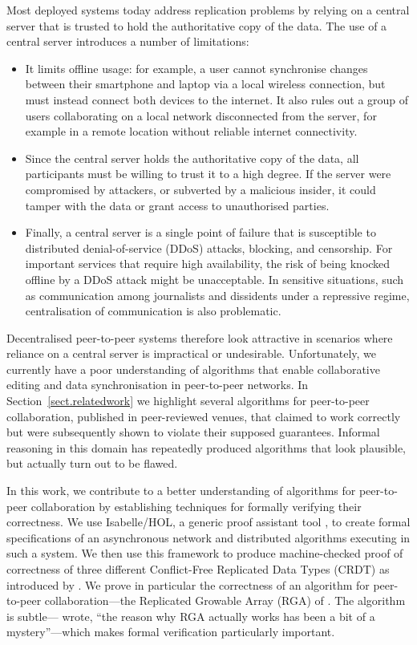\documentclass[acmlarge,review,anonymous]{acmart}\settopmatter{printfolios=true}
\begin{document}
Most deployed systems today address replication problems by relying on a central server that is
trusted to hold the authoritative copy of the data. The use of a central server introduces a number of limitations:
\begin{itemize}
\item It limits offline usage: for example, a user cannot synchronise changes between their
    smartphone and laptop via a local wireless connection, but must instead connect both devices to
    the internet. It also rules out a group of users collaborating on a local network disconnected
    from the server, for example in a remote location without reliable internet connectivity.
\item Since the central server holds the authoritative copy of the data, all participants must be
    willing to trust it to a high degree. If the server were compromised by attackers, or subverted
    by a malicious insider, it could tamper with the data or grant access to unauthorised parties.
\item Finally, a central server is a single point of failure that is susceptible to distributed
    denial-of-service (DDoS) attacks, blocking, and censorship. For important services that require
    high availability, the risk of being knocked offline by a DDoS attack might be unacceptable. In
    sensitive situations, such as communication among journalists and dissidents under a repressive
    regime, centralisation of communication is also problematic.
\end{itemize}

Decentralised peer-to-peer systems therefore look attractive in scenarios where reliance on a
central server is impractical or undesirable. Unfortunately, we currently have a poor understanding
of algorithms that enable collaborative editing and data synchronisation in peer-to-peer networks.
In Section~\ref{sect.relatedwork} we highlight several algorithms for peer-to-peer collaboration,
published in peer-reviewed venues, that claimed to work correctly but were subsequently shown to violate
their supposed guarantees. Informal reasoning in this domain has repeatedly produced algorithms that
look plausible, but actually turn out to be flawed.

In this work, we contribute to a better understanding of algorithms for peer-to-peer collaboration
by establishing techniques for formally verifying their correctness. We use Isabelle/HOL, a generic
proof assistant tool \cite{DBLP:conf/tphol/WenzelPN08}, to create formal specifications of an
asynchronous network and distributed algorithms executing in such a system. We then use this
framework to produce machine-checked proof of correctness of three different Conflict-Free Replicated Data Types (CRDT) as introduced by
\citet{Shapiro:2011wy,Shapiro:2011un}. We prove in particular the correctness of an algorithm for
peer-to-peer collaboration---the Replicated Growable Array (RGA) of \citet{Roh:2011dw}.
The algorithm is subtle---\citet{Attiya:2016kh} wrote, ``the reason why RGA actually works has been
a bit of a mystery''---which makes formal verification particularly important.
\end{document}
